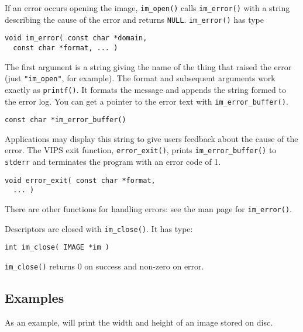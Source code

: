 If an error occurs opening the image, \verb+im_open()+ calls
\verb+im_error()+ with a string describing the cause of the error and
returns \verb+NULL+. \verb+im_error()+ has type

\begin{verbatim}
void im_error( const char *domain,
  const char *format, ... )
\end{verbatim}

\noindent
The first argument is a string giving the name of the thing that raised
the error (just \verb+"im_open"+, for example). The format and subsequent
arguments work exactly as \verb+printf()+.  It formats the message and
appends the string formed to the error log. You can get a pointer to the
error text with \verb+im_error_buffer()+.

\begin{verbatim}
const char *im_error_buffer()
\end{verbatim}

\noindent
Applications may display this string to give users feedback about the
cause of the error. The VIPS exit function, \verb+error_exit()+, prints
\verb+im_error_buffer()+ to \verb+stderr+ and terminates the program with an
error code of 1.

\begin{verbatim}
void error_exit( const char *format, 
  ... )
\end{verbatim}

\noindent
There are other functions for handling errors: see the man page for
\verb+im_error()+.

Descriptors are closed with \verb+im_close()+. It has type:

\begin{verbatim}
int im_close( IMAGE *im )
\end{verbatim}

\verb+im_close()+ returns 0 on success and non-zero on error.  

\subsection{Examples}
\label{sec:examples}

As an example,  will print the width and height
of an image stored on disc.

